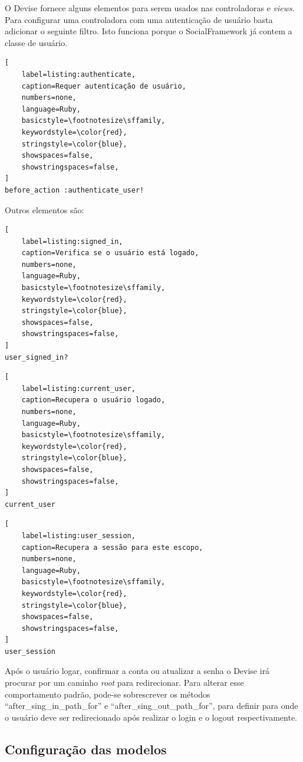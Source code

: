 O Devise fornece alguns elementos para serem usados nas controladoras e \textit{views}. Para configurar uma controladora com uma autenticação de usuário basta adicionar o seguinte filtro. Isto funciona porque o SocialFramework já contem a classe de usuário.

\begin{lstlisting}[
    label=listing:authenticate,
    caption=Requer autenticação de usuário,
    numbers=none,
    language=Ruby,
    basicstyle=\footnotesize\sffamily,
    keywordstyle=\color{red},
    stringstyle=\color{blue},
    showspaces=false,
    showstringspaces=false,
]
before_action :authenticate_user!
\end{lstlisting}

Outros elementos são:

\begin{lstlisting}[
    label=listing:signed_in,
    caption=Verifica se o usuário está logado,
    numbers=none,
    language=Ruby,
    basicstyle=\footnotesize\sffamily,
    keywordstyle=\color{red},
    stringstyle=\color{blue},
    showspaces=false,
    showstringspaces=false,
]
user_signed_in?
\end{lstlisting}

\begin{lstlisting}[
    label=listing:current_user,
    caption=Recupera o usuário logado,
    numbers=none,
    language=Ruby,
    basicstyle=\footnotesize\sffamily,
    keywordstyle=\color{red},
    stringstyle=\color{blue},
    showspaces=false,
    showstringspaces=false,
]
current_user
\end{lstlisting}

\begin{lstlisting}[
    label=listing:user_session,
    caption=Recupera a sessão para este escopo,
    numbers=none,
    language=Ruby,
    basicstyle=\footnotesize\sffamily,
    keywordstyle=\color{red},
    stringstyle=\color{blue},
    showspaces=false,
    showstringspaces=false,
]
user_session
\end{lstlisting}

Após o usuário logar, confirmar a conta ou atualizar a senha o Devise irá procurar por um caminho \textit{root} para redirecionar. Para alterar esse comportamento padrão, pode-se sobrescrever os métodos ``after\_sing\_in\_path\_for'' e ``after\_sing\_out\_path\_for'', para definir para onde o usuário deve ser redirecionado após realizar o login e o logout respectivamente.

\subsection{Configuração das modelos}
\label{configuracao_das_modelos}

